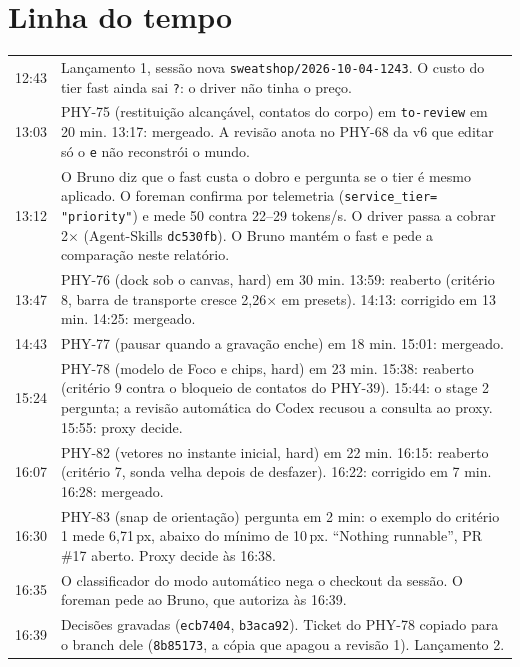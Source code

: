 \documentclass[11pt,a4paper]{article}
\begin{document}
\section{Linha do tempo}

\begin{tabularx}{\linewidth}{@{}lX@{}}
\toprule
12:43 & Lançamento 1, sessão nova \texttt{sweatshop/2026-10-04-1243}. O custo
        do tier fast ainda sai \texttt{?}: o driver não tinha o preço.\\
13:03 & PHY-75 (restituição alcançável, contatos do corpo) em
        \texttt{to-review} em 20 min. 13:17: mergeado. A revisão anota no PHY-68
        da v6 que editar só o \texttt{e} não reconstrói o mundo.\\
13:12 & O Bruno diz que o fast custa o dobro e pergunta se o tier é mesmo
        aplicado. O foreman confirma por telemetria (\texttt{service\_tier=
        "priority"}) e mede 50 contra 22--29 tokens/s. O driver passa a cobrar
        2$\times$ (Agent-Skills \texttt{dc530fb}). O Bruno mantém o fast e pede a
        comparação neste relatório.\\
13:47 & PHY-76 (dock sob o canvas, hard) em 30 min. 13:59: reaberto
        (critério 8, barra de transporte cresce 2,26$\times$ em presets).
        14:13: corrigido em 13 min. 14:25: mergeado.\\
14:43 & PHY-77 (pausar quando a gravação enche) em 18 min. 15:01:
        mergeado.\\
15:24 & PHY-78 (modelo de Foco e chips, hard) em 23 min. 15:38: reaberto
        (critério 9 contra o bloqueio de contatos do PHY-39). 15:44: o stage 2
        pergunta; a revisão automática do Codex recusou a consulta ao proxy.
        15:55: proxy decide.\\
16:07 & PHY-82 (vetores no instante inicial, hard) em 22 min. 16:15:
        reaberto (critério 7, sonda velha depois de desfazer). 16:22:
        corrigido em 7 min. 16:28: mergeado.\\
16:30 & PHY-83 (snap de orientação) pergunta em 2 min: o exemplo do critério 1
        mede 6,71\,px, abaixo do mínimo de 10\,px. ``Nothing runnable'', PR
        \#17 aberto. Proxy decide às 16:38.\\
16:35 & O classificador do modo automático nega o checkout da sessão. O
        foreman pede ao Bruno, que autoriza às 16:39.\\
16:39 & Decisões gravadas (\texttt{ecb7404}, \texttt{b3aca92}). Ticket do
        PHY-78 copiado para o branch dele (\texttt{8b85173}, a cópia que apagou
        a revisão 1). Lançamento 2.\\

\end{tabularx}
\end{document}
